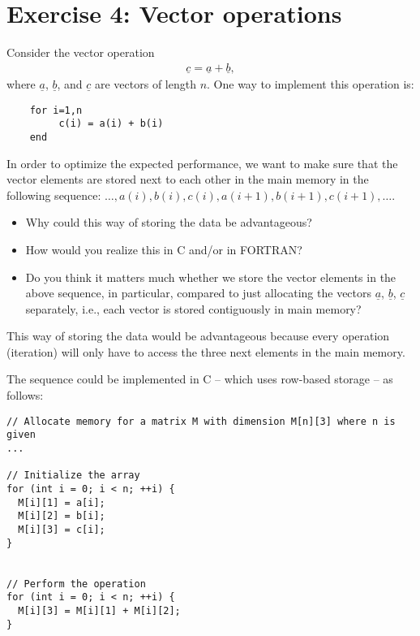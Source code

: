 \section{Exercise 4: Vector operations} %
\label{sec:exercise_4_vector_operations}
\begin{question}
  Consider the vector operation 
\begin{align*}
\underline{c} = \underline{a} + \underline{b},
\end{align*}
where $\underline{a}$, $\underline{b}$, and $\underline{c}$ 
are vectors of length $n$. One way to implement this operation is: 
\begin{verbatim}
    for i=1,n
         c(i) = a(i) + b(i)
    end
\end{verbatim}

\noindent In order to optimize the expected performance, we want to make sure that the vector elements are stored next to each other in the main memory in the following sequence: $\ldots, a(i), b(i), c(i), a(i+1), b(i+1), c(i+1), \ldots$.
\begin{itemize}
\item Why could this way of storing the data be advantageous?
\item How would you realize this in C and/or in FORTRAN?
\item Do you think it matters much whether we store the vector elements
in the above sequence, in particular, compared to just allocating the vectors 
$\underline{a}$, $\underline{b}$, $\underline{c}$ separately, 
i.e., each vector is stored contiguously in main memory?
\end{itemize}
\end{question}

\noindent This way of storing the data would be advantageous because every operation (iteration) will only have to access the three next elements in the main memory.

The sequence could be implemented in C -- which uses row-based storage -- as follows:

\begin{lstlisting}
// Allocate memory for a matrix M with dimension M[n][3] where n is given
...

// Initialize the array
for (int i = 0; i < n; ++i) {
  M[i][1] = a[i];
  M[i][2] = b[i];
  M[i][3] = c[i];
}


// Perform the operation
for (int i = 0; i < n; ++i) {
  M[i][3] = M[i][1] + M[i][2];
}
\end{lstlisting}

